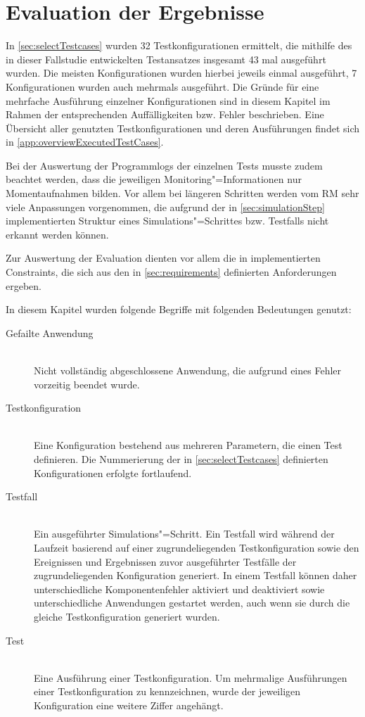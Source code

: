\chapter{Evaluation der Ergebnisse}
\label{chap:evaluationResults}

In \autoref{sec:selectTestcases} wurden 32 Testkonfigurationen ermittelt, die mithilfe des in dieser Fallstudie entwickelten Testansatzes insgesamt 43 mal ausgeführt wurden.
Die meisten Konfigurationen wurden hierbei jeweils einmal ausgeführt, 7 Konfigurationen wurden auch mehrmals ausgeführt.
Die Gründe für eine mehrfache Ausführung einzelner Konfigurationen sind in diesem Kapitel im Rahmen der entsprechenden Auffälligkeiten bzw. Fehler beschrieben.
Eine Übersicht aller genutzten Testkonfigurationen und deren Ausführungen findet sich in \autoref{app:overviewExecutedTestCases}.

Bei der Auswertung der Programmlogs der einzelnen Tests musste zudem beachtet werden, dass die jeweiligen Monitoring"=Informationen nur Momentaufnahmen bilden.
Vor allem bei längeren Schritten werden vom \ac{RM} sehr viele Anpassungen vorgenommen, die aufgrund der in \autoref{sec:simulationStep} implementierten Struktur eines Simulations"=Schrittes bzw. Testfalls nicht erkannt werden können.

Zur Auswertung der Evaluation dienten vor allem die in  implementierten Constraints, die sich aus den in \autoref{sec:requirements} definierten Anforderungen ergeben.

In diesem Kapitel wurden folgende Begriffe mit folgenden Bedeutungen genutzt:

\begin{description}
    \item [Gefailte Anwendung] \hfill \\
        Nicht vollständig abgeschlossene Anwendung, die aufgrund eines Fehler vorzeitig beendet wurde.
    \item [Testkonfiguration] \hfill \\
        Eine Konfiguration bestehend aus mehreren Parametern, die einen Test definieren.
        Die Nummerierung der in \autoref{sec:selectTestcases} definierten Konfigurationen erfolgte fortlaufend.
    \item [Testfall] \hfill \\
        Ein ausgeführter Simulations"=Schritt.
        Ein Testfall wird während der Laufzeit basierend auf einer zugrundeliegenden Testkonfiguration sowie den Ereignissen und Ergebnissen zuvor ausgeführter Testfälle der zugrundeliegenden Konfiguration generiert.
        In einem Testfall können daher unterschiedliche Komponentenfehler aktiviert und deaktiviert sowie unterschiedliche Anwendungen gestartet werden, auch wenn sie durch die gleiche Testkonfiguration generiert wurden.
    \item [Test] \hfill \\
        Eine Ausführung einer Testkonfiguration.
        Um mehrmalige Ausführungen einer Testkonfiguration zu kennzeichnen, wurde der jeweiligen Konfiguration eine weitere Ziffer angehängt.
\end{description}

